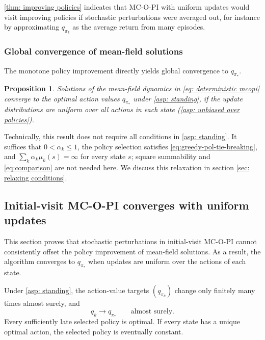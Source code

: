 \documentclass[twoside,11pt]{article}
\newtheorem{proposition}[proposition]{Proposition}
\newcommand{\pol}{\pi}
\newcommand{\qval}{q}
\newcommand{\qopt}{\qval_{\best{\pol}}}
\newcommand{\best}[1]{{#1}_*}
\DeclareRobustCommand{\reviewbarstart}{%
  \ifhmode %
    \vadjust{\vbox to 0pt{%
      \vskip-\ht\strutbox %
      \vskip-\dp\strutbox %
      \cbstart[\changebarwidth] %
      \vss %
    }}%
  \else %
    \cbstart[\changebarwidth]%
  \fi %
} %
\providecommand{\DIFadd}[1]{#1} %
\providecommand{\DIFaddbegin}{\reviewbarstart} %
\providecommand{\DIFaddend}{\protect\cbend} %
\def\DIFadd#1{#1}%
\def\DIFaddbegin{}%
\def\DIFaddend{}%
\begin{document}
\autoref{thm: improving policies} indicates that
MC-O-PI with uniform updates would visit improving policies
if stochastic perturbations were averaged out, for instance by approximating $q_{\pi_k}$ as the average return from many episodes.

 \subsubsection{Global convergence of mean-field solutions}

The monotone policy improvement directly yields global convergence to $\qopt$.

\begin{proposition}
\label{thm: convergence deterministic mcopi}
    Solutions of the mean-field dynamics in \eqref{eq: deterministic mcopi} converge to the optimal action values $\qopt$
    under \autoref{asp: standing},
    if the update distributions are uniform over all actions in each state (\autoref{asp: unbiased over policies}).
\end{proposition}

Technically, this result does not require all conditions in \autoref{asp: standing}. It suffices  \DIFaddbegin \DIFadd{that $0<\alpha_k\le1$, the policy selection satisfies \eqref{eq:greedy-pol-tie-breaking}, and $\sum_k\alpha_k\mu_k(s)=\infty$ for every state $s$; square summability and \eqref{eq:comparison} are not needed here}\DIFaddend . We discuss this relaxation in section \ref{sec: relaxing conditions}.


 \subsection{Initial-visit MC-O-PI converges with uniform updates}
 This section proves that stochastic perturbations in initial-visit MC-O-PI cannot consistently offset the policy improvement of mean-field solutions. As a result, the algorithm converges to $\qopt$ when updates are uniform over the actions of each state.

 \DIFaddbegin \begin{theorem}
\label{thm: convergence mcopi uniform}
\DIFadd{Under \autoref{asp: standing}, the action-value targets $(q_{\pi_k})$ change only finitely many times almost surely, and
}\[
\DIFadd{q_k\longrightarrow q_{\pi_*}\qquad\text{almost surely}.
}\]\DIFaddend 
 \DIFaddbegin \DIFadd{Every sufficiently late selected policy is optimal. If every state has a unique optimal action, the selected policy is eventually constant.
}\end{theorem}
\DIFaddend 
\end{document}
